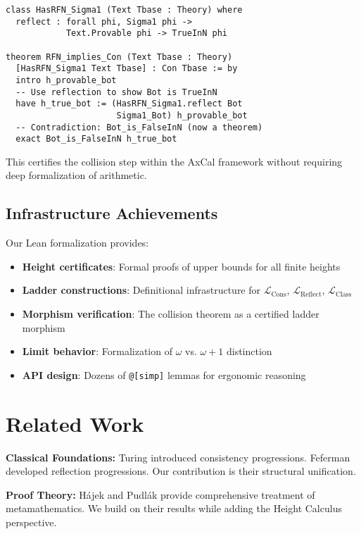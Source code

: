 \documentclass[11pt]{article}
\newcommand{\LCons}{\mathcal{L}_{\mathrm{Cons}}}
\newcommand{\LReflect}{\mathcal{L}_{\mathrm{Reflect}}}
\newcommand{\LClass}{\mathcal{L}_{\mathrm{Class}}}
\begin{document}
\begin{lstlisting}[language=Lean, caption={Schematic Proof of RFN implies Con}]
class HasRFN_Sigma1 (Text Tbase : Theory) where
  reflect : forall phi, Sigma1 phi -> 
            Text.Provable phi -> TrueInN phi

theorem RFN_implies_Con (Text Tbase : Theory) 
  [HasRFN_Sigma1 Text Tbase] : Con Tbase := by
  intro h_provable_bot
  -- Use reflection to show Bot is TrueInN
  have h_true_bot := (HasRFN_Sigma1.reflect Bot 
                      Sigma1_Bot) h_provable_bot
  -- Contradiction: Bot_is_FalseInN (now a theorem)
  exact Bot_is_FalseInN h_true_bot
\end{lstlisting}

This certifies the collision step within the AxCal framework without requiring deep formalization of arithmetic.

\subsection{Infrastructure Achievements}
Our Lean formalization provides:
\begin{itemize}
\item \textbf{Height certificates}: Formal proofs of upper bounds for all finite heights
\item \textbf{Ladder constructions}: Definitional infrastructure for $\LCons$, $\LReflect$, $\LClass$
\item \textbf{Morphism verification}: The collision theorem as a certified ladder morphism
\item \textbf{Limit behavior}: Formalization of $\omega$ vs. $\omega+1$ distinction
\item \textbf{API design}: Dozens of \texttt{@[simp]} lemmas for ergonomic reasoning
\end{itemize}

\section{Related Work}

\textbf{Classical Foundations:} Turing \cite{Turing1939} introduced consistency progressions. Feferman \cite{Feferman1962} developed reflection progressions. Our contribution is their structural unification.

\textbf{Proof Theory:} Hájek and Pudlák \cite{HajekPudlak} provide comprehensive treatment of metamathematics. We build on their results while adding the Height Calculus perspective.
\end{document}
